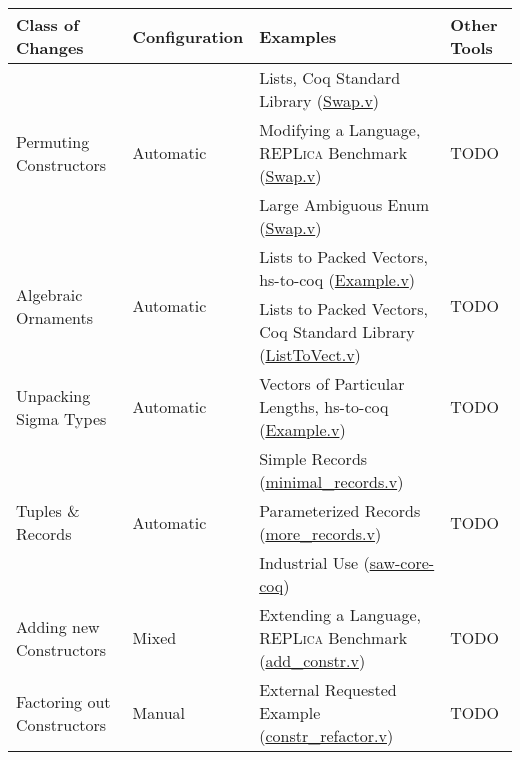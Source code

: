 \begin{figure*}
\small
  \begin{tabular}{|l|l|l|l|}
    \hline
    \textbf{Class of Changes} & \textbf{Configuration} & \textbf{Examples} & \textbf{Other Tools} \\
    \hline
    \multirow[t]{3}{*}{Permuting Constructors} & \multirow[t]{3}{*}{Automatic} & Lists, Coq Standard Library (\href{https://github.com/uwplse/pumpkin-pi/blob/master/plugin/coq/Swap.v}{Swap.v}) & \multirow[t]{3}{*}{TODO}\\
     & & Modifying a Language, \textsc{REPLica} Benchmark (\href{https://github.com/uwplse/pumpkin-pi/blob/master/plugin/coq/Swap.v}{Swap.v}) & \\
    & & Large Ambiguous Enum (\href{https://github.com/uwplse/pumpkin-pi/blob/master/plugin/coq/Swap.v}{Swap.v}) & \\
    \hline
    \multirow[t]{2}{*}{Algebraic Ornaments} & \multirow[t]{2}{*}{Automatic} & Lists to Packed Vectors, hs-to-coq (\href{https://github.com/uwplse/pumpkin-pi/blob/master/plugin/coq/examples/Example.v}{Example.v}) & \multirow[t]{2}{*}{TODO}\\
    & & Lists to Packed Vectors, Coq Standard Library (\href{https://github.com/uwplse/pumpkin-pi/blob/master/plugin/coq/examples/ListToVect.v}{ListToVect.v}) & \\
    \hline
    Unpacking Sigma Types & Automatic & Vectors of Particular Lengths, hs-to-coq (\href{https://github.com/uwplse/pumpkin-pi/blob/master/plugin/coq/examples/Example.v}{Example.v}) & TODO\\
    \hline
    \multirow[t]{3}{*}{Tuples \& Records} & \multirow[t]{3}{*}{Automatic} & Simple Records (\href{https://github.com/uwplse/pumpkin-pi/blob/master/plugin/coq/minimal_records.v}{minimal\_records.v}) & \multirow[t]{3}{*}{TODO}\\
    & & Parameterized Records (\href{https://github.com/uwplse/pumpkin-pi/blob/master/plugin/coq/more_records.v}{more_records.v}) & \\
    & & Industrial Use (\href{https://github.com/Ptival/saw-core-coq/tree/dump-wip}{saw-core-coq}) & \\
    \hline
    Adding new Constructors & Mixed & Extending a Language, \textsc{REPLica} Benchmark (\href{https://github.com/uwplse/pumpkin-pi/blob/master/plugin/coq/playground/add_constr.v}{add\_constr.v}) & TODO\\
    \hline
    Factoring out Constructors & Manual & External Requested Example (\href{https://github.com/uwplse/pumpkin-pi/blob/master/plugin/coq/playground/constr_refactor.v}{constr\_refactor.v}) & TODO\\

\end{tabular}
\end{figure*}
